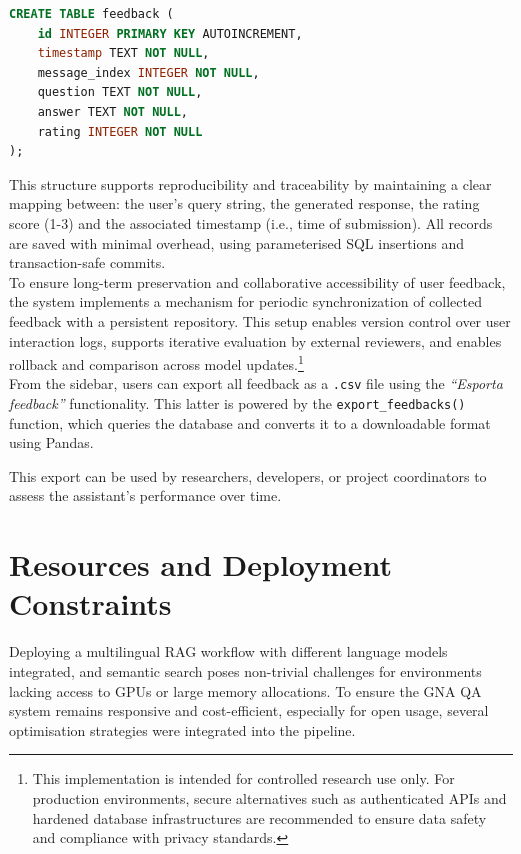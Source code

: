 \begin{spacing}{1.5}
\begin{lstlisting}[language=SQL,
                  frame=none,
                   caption={SQL schema of the feedback database.},
                   captionpos=b,
                   label={lst:sql_schema},
  xleftmargin=0.2\textwidth,
  xrightmargin=0.1\textwidth]
CREATE TABLE feedback (
    id INTEGER PRIMARY KEY AUTOINCREMENT,
    timestamp TEXT NOT NULL,
    message_index INTEGER NOT NULL,
    question TEXT NOT NULL,
    answer TEXT NOT NULL,
    rating INTEGER NOT NULL
);
\end{lstlisting}

This structure supports reproducibility and traceability by maintaining a clear mapping between: the user's query string, the generated response, the rating score (1-3) and the associated timestamp (i.e., time of submission). All records are saved with minimal overhead, using parameterised SQL insertions and transaction-safe commits.\\

To ensure long-term preservation and collaborative accessibility of user feedback, the system implements a mechanism for periodic synchronization of collected feedback with a persistent repository. This setup enables version control over user interaction logs, supports iterative evaluation by external reviewers, and enables rollback and comparison across model updates.\footnote{This implementation is intended for controlled research use only. For production environments, secure alternatives such as authenticated APIs and hardened database infrastructures are recommended to ensure data safety and compliance with privacy standards.}\\

From the sidebar, users can export all feedback as a \texttt{.csv} file using the \textit{``Esporta feedback''} functionality. This latter is powered by the \texttt{export\_feedbacks()} function, which queries the database and converts it to a downloadable format using Pandas. 

This export can be used by researchers, developers, or project coordinators to assess the assistant's performance over time.


\section{Resources and Deployment Constraints}
Deploying a multilingual RAG workflow with different language models integrated, and semantic search poses non-trivial challenges for environments lacking access to GPUs or large memory allocations. To ensure the GNA QA system remains responsive and cost-efficient, especially for open usage, several optimisation strategies were integrated into the pipeline.


\end{spacing}
